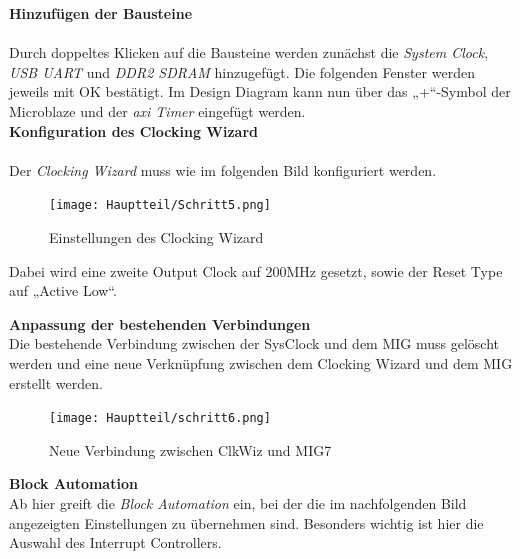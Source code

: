 \vspace{10mm}


\textbf{Hinzufügen der Bausteine}\\\\
Durch doppeltes Klicken auf die Bausteine werden zunächst die \emph{System Clock}, \emph{USB UART} und \emph{DDR2 SDRAM} hinzugefügt. Die folgenden Fenster werden jeweils mit OK bestätigt.
Im Design Diagram kann nun über das „+“-Symbol der Microblaze und der \emph{\ac{axi} Timer} eingefügt werden.\\

\newpage
\textbf{Konfiguration des Clocking Wizard}\\\\
Der \emph{Clocking Wizard} muss wie im folgenden Bild konfiguriert werden.\\

\vspace{10mm}

\begin{figure}[H]
\centering
\texttt{[image: Hauptteil/Schritt5.png]}
\caption{Einstellungen des Clocking Wizard}\label{fig:mbschritt5}
\end{figure}

\vspace{10mm}

Dabei wird eine zweite Output Clock auf 200MHz gesetzt, sowie der Reset Type auf „Active Low“.\\

\newpage

\textbf{Anpassung der bestehenden Verbindungen}\\

Die bestehende Verbindung zwischen der SysClock und dem MIG muss gelöscht werden und eine neue Verknüpfung zwischen dem Clocking Wizard und dem MIG erstellt werden.\\

\begin{figure}[H]
\centering
\texttt{[image: Hauptteil/schritt6.png]}
\caption{Neue Verbindung zwischen ClkWiz und MIG7}\label{fig:mbschritt6}
\end{figure}

\vspace{10mm}

\textbf{Block Automation}\\

Ab hier greift die \emph{Block Automation} ein, bei der die im nachfolgenden Bild angezeigten Einstellungen zu übernehmen sind.
Besonders wichtig ist hier die Auswahl des Interrupt Controllers.

